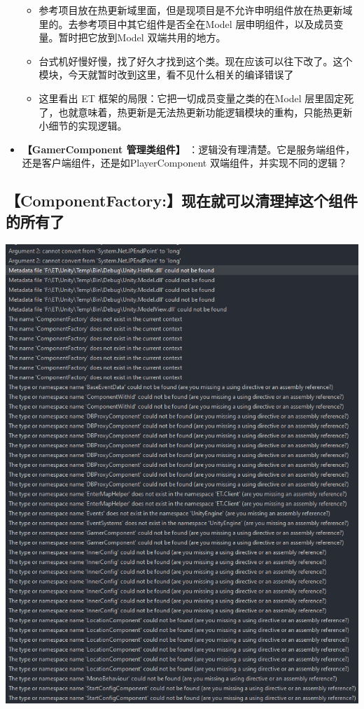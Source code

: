 \documentclass[9pt, b5paper]{article}
\begin{document}
\begin{itemize}
\begin{itemize}
\item 参考项目放在热更新域里面，但是现项目是不允许申明组件放在热更新域里的。去参考项目中其它组件是否全在Model 层申明组件，以及成员变量。暂时把它放到Model 双端共用的地方。
\item 台式机好慢好慢，找了好久才找到这个类。现在应该可以往下改了。这个模块，今天就暂时改到这里，看不见什么相关的编译错误了
\item 这里看出 ET 框架的局限：它把一切成员变量之类的在Model 层里固定死了，也就意味着，热更新是无法热更新功能逻辑模块的重构，只能热更新小细节的实现逻辑。
\end{itemize}
\item \textbf{【GamerComponent 管理类组件】} ：逻辑没有理清楚。它是服务端组件，还是客户端组件，还是如PlayerComponent 双端组件，并实现不同的逻辑？
\end{itemize}
\subsection{【ComponentFactory:】现在就可以清理掉这个组件的所有了}
\label{sec:orgea5665e}
\begin{center}
\includegraphics[width=.9\linewidth]{./pic/et4_20230623_152737.png}
\end{center}
\end{document}
